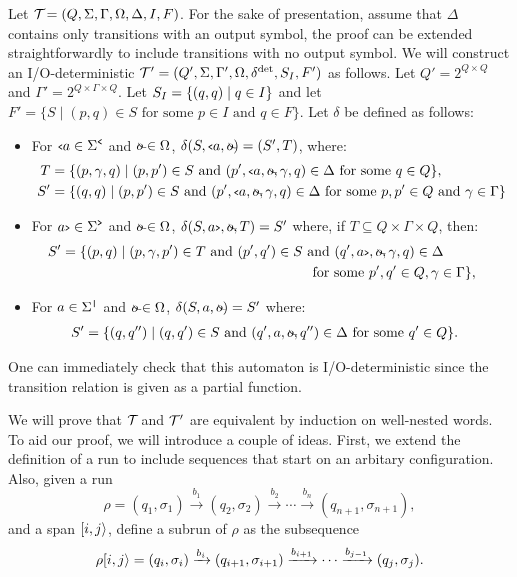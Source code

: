 
Let $\mathcal{T}\! = (Q, \Sigma, \Gamma, \Omega, \Delta, I, F)$.
	For the sake of presentation, assume that $\Delta$ contains only transitions with an output symbol, the proof can be extended straightforwardly to include transitions with no output symbol.
	We will construct an I/O-deterministic \vpann $\mathcal{T}\!\,' = ( Q', \Sigma, \Gamma', \Omega, \delta^{\operatorname{det}}, S_{I}, F')$ as follows.
	Let $Q' = 2^{Q\times Q}$ and $\Gamma' = 2^{Q\times\Gamma\times Q}$. 
	Let $S_I = \{(q,q)\mid q\in I\}$ and let $F' = \{S\mid (p,q)\in S\text{ for some }p\in I \text{ and } q\in F \}$. 
	Let $\delta$ be defined as follows:
	\begin{itemize}
		\item For ${\scriptsize\texttt{<}} a\in \Sigma^{\texttt{<}}$ and $\oout\in\Omega$, $\delta(S,\op{a},\oout) = (S',T)$, where:
		\begin{align*}
			T &= \{(p,\gamma,q)\mid (p,p')\in S \text{ and } (p',\op{a},\oout,\gamma,q)\in\Delta\text{ for some }q\in Q \},\\
			S'&= \{(q,q)\mid(p,p')\in S\text{ and }(p',\op{a},\oout,\gamma,q)\in\Delta\text{ for some }p,p'\in Q \text{ and } \gamma\in\Gamma\}
		\end{align*}
		\item For $a{\scriptsize\texttt{>}}\in\Sigma^{\texttt{>}}$ and $\oout\in\Omega$, $\delta(S,\cl{a},\oout,T) = S'$ where, if $T\subseteq Q\times\Gamma\times Q$, then: 
		\begin{align*}
			S' &= \{(p,q)\mid(p,\gamma,p')\in T\text{ and }(p',q')\in S\text{ and }(q',\cl{a},\oout,\gamma,q)\in\Delta\ \ \ \ \ \ \ \ \ \ \ \\ &\ \ \ \ \ \ \ \ \ \ \ \ \ \ \ \ \ \ \ \ \ \ \ \ \ \ \ \ \ \ \ \ \ \ \ \ \ \ \ \ \ \ \ \ \ \ \ \ \ \ \ \ \ \text{ for some }p',q'\in Q,\gamma\in\Gamma\},
		\end{align*}
		\item For $a\in\Sigma^{\texttt{|}}$ and $\oout\in\Omega$, $\delta(S,a,\oout) = S'$ where:
		\begin{align*}
			S' &= \{(q,q'')\mid (q,q')\in S\text{ and }(q',a,\oout,q'')\in\Delta\text{ for some }q'\in Q\}.
		\end{align*}
	\end{itemize}
	One can immediately check that this automaton is I/O-deterministic since the transition relation is given as a partial function.
	
	We will prove that $\mathcal{T}\!$ and $\mathcal{T}\!\,'$ are equivalent by induction on well-nested words. To aid our proof, we will introduce a couple of ideas. First, we extend the definition of a run to include sequences that start on an arbitary configuration. Also, given a run 
	$$
	\rho = (q_1, \sigma_1) \xrightarrow{b_1} (q_2, \sigma_2) \xrightarrow{b_2} \cdots  \xrightarrow{b_n} (q_{n+1}, \sigma_{n+1}),
	$$
	\noindent and a span $[i,j\rangle$, define a subrun of $\rho$ as the subsequence
	$$
	\rho[i,j\rangle = (q_i, \sigma_i) \xrightarrow{b_{i}} (q_{i+1}, \sigma_{i+1}) \xrightarrow{b_{i+1}} \cdots  \xrightarrow{b_{j-1}} (q_j, \sigma_j).
	$$
	
